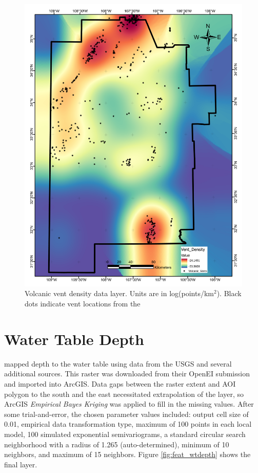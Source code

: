 \begin{figure}[H]
\centering
\includegraphics[width=0.75\linewidth]{templates/images/Figure-VentDensity.pdf}
\caption[Volcanic vent data layer]{Volcanic vent density data layer. Units are in log(points/km$^2$). Black dots indicate vent locations from the \protect\citet{nmbgmr_nmbgmr_2021}}
\label{fig:feat_vents}
\end{figure}
\pagebreak

\section{Water Table Depth}\label{app:dl_wt_depth}
\citet{bielicki_hydrogeolgic_2015} mapped depth to the water table using data from the USGS and several additional sources. This raster was downloaded from their OpenEI submission \citep{kelley_geothermal_2015} and imported into ArcGIS. Data gaps between the raster extent and AOI polygon to the south and the east necessitated extrapolation of the layer, so ArcGIS \textit{Empirical Bayes Kriging} was applied to fill in the missing values. After some trial-and-error, the chosen parameter values included: output cell size of 0.01, empirical data transformation type, maximum of 100 points in each local model, 100 simulated exponential semivariograms, a standard circular search neighborhood with a radius of 1.265 (auto-determined), minimum of 10 neighbors, and maximum of 15 neighbors. Figure \ref{fig:feat_wtdepth} shows the final layer.
\vfill
\pagebreak

